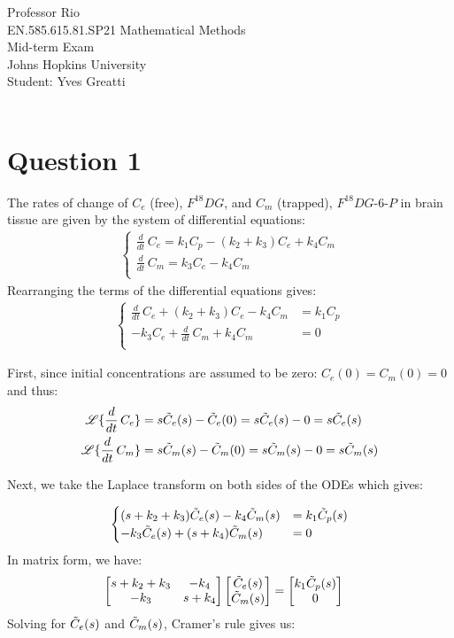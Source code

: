 \documentclass[12pt,twoside]{article}
\begin{document}
\noindent Professor Rio\\
EN.585.615.81.SP21 Mathematical Methods\\
Mid-term Exam\\
Johns Hopkins University\\
Student: Yves Greatti\\\

\section*{Question 1}

The rates of change of $C_e$ (free), $F^{18}DG$,  and $C_m$ (trapped), $F^{18}DG$-$6$-$P$
in brain tissue  are given by the system of differential equations:
\begin{align*}
	\begin{cases}
		\frac{d}{dt} \, C_e  = k_1 C_p - (k_2 + k_3) C_e + k_4 C_m \\
		\frac{d}{dt} \, C_m = k_3 C_e -  k_4 C_m \\
	\end{cases}
\end{align*}
Rearranging the terms of the differential equations gives:
\begin{align*}
	\begin{cases}
		\frac{d}{dt} \, C_e  + (k_2 + k_3) C_e - k_4 C_m  &= k_1 C_p \\
		- k_3 C_e + \frac{d}{dt} \, C_m + k_4 C_m  &= 0\\
	\end{cases}
\end{align*}

First, since initial concentrations are assumed to be zero: $C_e(0) = C_m(0) = 0$ and thus:
\begin{align*}
\mathscr{L}\{ \frac{d}{dt} \, C_e  \} &= s \tilde{ C }_e(s) - \tilde{ C }_e(0) = s \tilde{ C }_e(s) - 0 = s \tilde{ C }_e(s) \\
\mathscr{L}\{ \frac{d}{dt} \, C_m  \} &= s \tilde{ C }_m(s) - \tilde{ C }_m(0) = s \tilde{ C }_m(s) - 0 = s \tilde{ C }_m(s) \\
\end{align*}

Next, we take the Laplace transform on both sides of the ODEs which gives:

\begin{align*}
	\begin{cases}
		(s + k_2 + k_3)  \tilde{ C }_e(s)  - k_4 \tilde{ C }_m(s) &= k_1 \tilde{ C }_p(s) \\
		-k_3  \tilde{ C }_e(s)  + (s + k_4) \tilde{ C }_m(s) &=  0
	\end{cases}
\end{align*}
 In matrix form, we have:
\begin{align*}
 \begin{bmatrix} s + k_2 + k_3 & -k_4 \\ -k_3 & s + k_4 \end{bmatrix} \begin{bmatrix}  \tilde{ C }_e(s) \\  \tilde{ C }_m(s) \end{bmatrix} &= \begin{bmatrix} k_1 \tilde{ C }_p(s)  \\ 0 \end{bmatrix}
\end{align*}
Solving for $\tilde{ C }_e(s)$ and $\tilde{ C }_m(s)$, Cramer's rule gives us:
\end{document}
